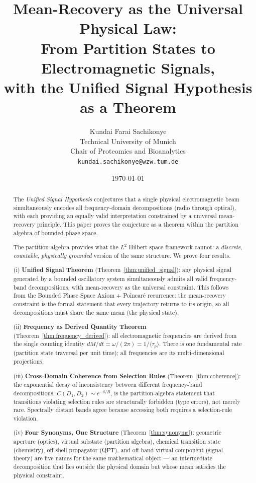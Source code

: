 \documentclass[twocolumn,10pt,a4paper]{article}
\title{\textbf{Mean-Recovery as the Universal Physical Law:\\
From Partition States to Electromagnetic Signals,\\
with the Unified Signal Hypothesis as a Theorem}}
\author{
Kundai Farai Sachikonye\\
Technical University of Munich\\
Chair of Proteomics and Bioanalytics\\
\texttt{kundai.sachikonye@wzw.tum.de}
}
\date{\today}
\theoremstyle{thmstyle}
\theoremstyle{definition}
\theoremstyle{remark}
\begin{document}
\maketitle

\begin{abstract}
\noindent
The \emph{Unified Signal Hypothesis} \citep{companion:signal_source} conjectures
that a single physical electromagnetic beam simultaneously encodes all
frequency-domain decompositions (radio through optical), with each providing
an equally valid interpretation constrained by a universal mean-recovery
principle.  This paper proves the conjecture as a theorem within the
partition algebra of bounded phase space.

The partition algebra provides what the $L^2$ Hilbert space framework
cannot: a \emph{discrete}, \emph{countable}, \emph{physically grounded}
version of the same structure.  We prove four results.

(i) \textbf{Unified Signal Theorem}
(Theorem~\ref{thm:unified_signal}): any physical signal generated by a
bounded oscillatory system simultaneously admits all valid frequency-band
decompositions, with mean-recovery as the universal constraint.  This
follows from the Bounded Phase Space Axiom + Poincar\'e recurrence: the
mean-recovery constraint is the formal statement that every trajectory
returns to its origin, so all decompositions must share the same mean
(the physical state).

(ii) \textbf{Frequency as Derived Quantity Theorem}
(Theorem~\ref{thm:frequency_derived}): all electromagnetic frequencies are
derived from the single counting identity $dM/dt = \omega/(2\pi) = 1/\langle\tau_p\rangle$.
There is one fundamental rate (partition state traversal per unit time);
all frequencies are its multi-dimensional projections.

(iii) \textbf{Cross-Domain Coherence from Selection Rules}
(Theorem~\ref{thm:coherence}): the exponential decay of inconsistency between
different frequency-band decompositions, $C(D_1,D_2) \sim e^{-\delta/B}$,
is the partition-algebra statement that transitions violating selection rules
are structurally forbidden (type errors), not merely rare.  Spectrally
distant bands agree because accessing both requires a selection-rule
violation.

(iv) \textbf{Four Synonyms, One Structure}
(Theorem~\ref{thm:synonyms}): geometric aperture (optics), virtual substate
(partition algebra), chemical transition state (chemistry), off-shell
propagator (QFT), and off-band virtual component (signal theory) are five
names for the same mathematical object --- an intermediate decomposition
that lies outside the physical domain but whose mean satisfies the physical
constraint.


\end{abstract}
\end{document}
